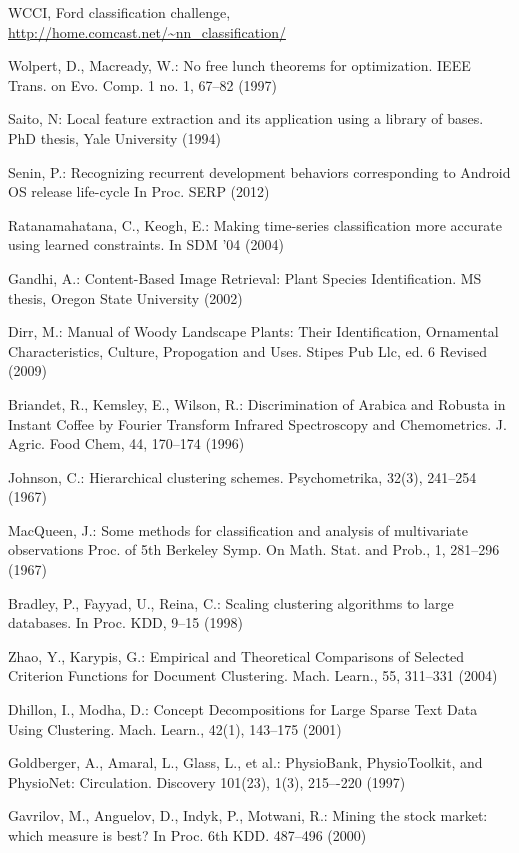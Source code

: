 \documentclass{llncs}
\begin{document}
\begin{thebibliography}{5}
WCCI, Ford classification challenge,
\url{http://home.comcast.net/~nn_classification/}

Wolpert, D., Macready, W.:
No free lunch theorems for optimization.
IEEE Trans. on Evo. Comp. 1 no. 1, 67--82 (1997)

Saito, N:
Local feature extraction and its application using a library of bases. 
PhD thesis, Yale University (1994)

Senin, P.: 
Recognizing recurrent development behaviors corresponding to Android OS release life-cycle
In Proc. SERP (2012)

Ratanamahatana, C., Keogh, E.:
Making time-series classification more accurate using learned constraints. 
In SDM '04 (2004)

Gandhi, A.:
Content-Based Image Retrieval: Plant Species Identification. 
MS thesis, Oregon State University (2002)

Dirr, M.:
Manual of Woody Landscape Plants: Their Identification, Ornamental Characteristics,
Culture, Propogation and Uses.
Stipes Pub Llc, ed. 6 Revised (2009)

Briandet, R., Kemsley, E., Wilson, R.:
Discrimination of Arabica and Robusta in Instant Coffee by Fourier Transform Infrared Spectroscopy
and Chemometrics.
J. Agric. Food Chem, 44, 170--174 (1996)

Johnson, C.:
Hierarchical clustering schemes.
Psychometrika, 32(3), 241--254 (1967)

MacQueen, J.:
Some methods for classification and analysis of multivariate observations
Proc. of 5th Berkeley Symp. On  Math. Stat. and Prob., 1, 281--296 (1967)

Bradley, P., Fayyad, U., Reina, C.:
Scaling clustering algorithms to large databases. 
In Proc. KDD, 9--15 (1998)

\enlargethispage{0.5cm} 
Zhao, Y., Karypis, G.:
Empirical and Theoretical Comparisons of Selected Criterion Functions for Document Clustering.
Mach. Learn., 55, 311--331 (2004)

Dhillon, I., Modha, D.:
Concept Decompositions for Large Sparse Text Data Using Clustering.
Mach. Learn., 42(1), 143--175 (2001)

Goldberger, A., Amaral, L., Glass, L., et al.: PhysioBank, PhysioToolkit, and 
PhysioNet: Circulation. Discovery 101(23), 1(3), 215–-220 (1997) 

Gavrilov, M., Anguelov, D., Indyk, P., Motwani, R.:
Mining the stock market: which measure is best? 
In Proc. 6th KDD. 487--496 (2000)



\end{thebibliography}
\end{document}
